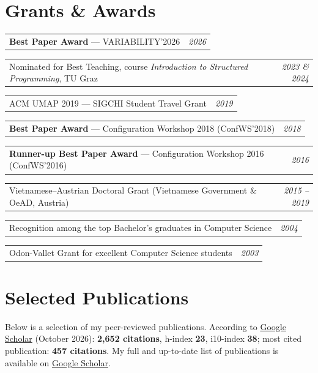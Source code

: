 \documentclass[11pt,a4paper]{article}
\makeatletter
\newcommand{\dated}[2]{%
  \begin{tabularx}{\linewidth}{@{}X r@{}}
    #1 & \textit{#2}
  \end{tabularx}\vspace{0.3ex}\par}
\makeatother
\begin{document}
\section{Grants \& Awards}
\dated{\textbf{Best Paper Award} --- VARIABILITY'2026}{2026}
\dated{Nominated for Best Teaching, course \textit{Introduction to Structured Programming}, TU Graz}{2023 \& 2024}
\dated{ACM UMAP 2019 --- SIGCHI Student Travel Grant}{2019}
\dated{\textbf{Best Paper Award} --- Configuration Workshop 2018 (ConfWS'2018)}{2018}
\dated{\textbf{Runner-up Best Paper Award} --- Configuration Workshop 2016 (ConfWS'2016)}{2016}
\dated{Vietnamese--Austrian Doctoral Grant (Vietnamese Government \& OeAD, Austria)}{2015 -- 2019}
\dated{Recognition among the top Bachelor's graduates in Computer Science}{2004}
\dated{Odon-Vallet Grant for excellent Computer Science students}{2003}

\section{Selected Publications}
Below is a selection of my peer-reviewed publications. According to
\href{https://scholar.google.com/citations?user=N53Bxl0AAAAJ&hl=en}{Google Scholar}
(October 2026): \textbf{2{,}652 citations}, h-index \textbf{23}, i10-index \textbf{38};
most cited publication: \textbf{457 citations}.
My full and up-to-date list of publications is available on
\href{https://scholar.google.com/citations?user=N53Bxl0AAAAJ&hl=en}{Google Scholar}.
\end{document}
